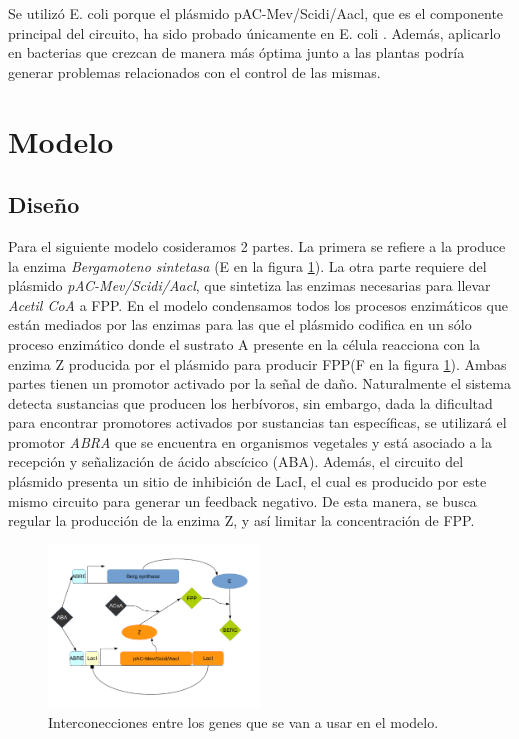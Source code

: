 \documentclass[12pt]{article}
\begin{document}
Se utiliz\'o E. coli porque el pl\'asmido pAC-Mev/Scidi/Aacl, que es el componente principal del circuito, ha sido probado \'unicamente en E. coli \cite{harada09b}. Adem\'as, aplicarlo en bacterias que crezcan de manera m\'as \'optima junto a las plantas podr\'ia generar problemas relacionados con el control de las mismas.

\section{Modelo}
\label{sec:model}
\subsection{Dise\~no}

Para el siguiente modelo cosideramos 2 partes. La primera se refiere a la produce la enzima \emph{Bergamoteno sintetasa} (E en la figura \ref{fig:Circuit}). La otra parte requiere del pl\'asmido \emph{pAC-Mev/Scidi/Aacl}, que sintetiza las enzimas necesarias para llevar \emph{Acetil CoA} a FPP. En el modelo condensamos todos los procesos enzim\'aticos que est\'an mediados por las enzimas para las que el pl\'asmido codifica en un s\'olo proceso enzim\'atico donde el sustrato A presente en la c\'elula reacciona con la enzima Z producida por el pl\'asmido para producir FPP(F en la figura \ref{fig:Circuit}). Ambas partes tienen un promotor activado por la se\~nal de da\~no. Naturalmente el sistema detecta sustancias que producen los herb\'ivoros, sin embargo, dada la dificultad para encontrar promotores activados por sustancias tan espec\'ificas, se utilizar\'a el promotor \emph{ABRA} que se encuentra en organismos vegetales y est\'a asociado a la recepci\'on y señalizaci\'on de \'acido absc\'icico (ABA). Adem\'as, el circuito del pl\'asmido presenta un sitio de inhibici\'on de LacI, el cual es producido por este mismo circuito para generar un feedback negativo. De esta manera, se busca regular la producci\'on de la enzima Z, y as\'i limitar la concentraci\'on de FPP.\\

\begin{figure}[H]
  \centering
  \includegraphics[width=0.5\textwidth]{Circuit.png}
  \caption{\label{fig:Circuit} Interconecciones entre los genes que se van a usar en el modelo.}
\end{figure}
\end{document}
